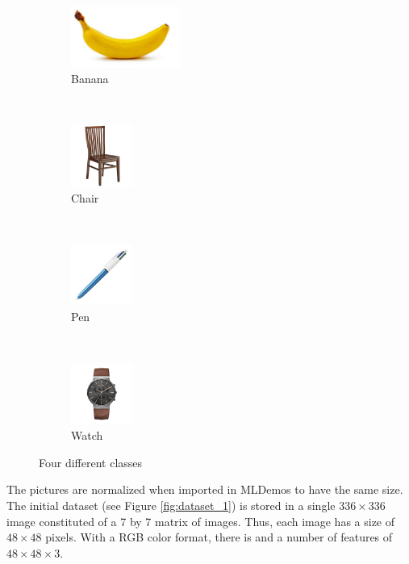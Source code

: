\documentclass[a4paper,10pt]{article}
\begin{document}
\begin{figure}[H]
\centering
    \begin{subfigure}[t]{0.2\textwidth}
        \centering
        \includegraphics[height=2cm]{pictures/banana} 
        \caption{Banana}
        \label{fig:banana}
    \end{subfigure}%
    ~
    \begin{subfigure}[t]{0.2\textwidth}
        \centering
        \includegraphics[height=2cm]{pictures/chair2} 
        \caption{Chair}
        \label{fig:chair}
    \end{subfigure} 
    ~
    \begin{subfigure}[t]{0.2\textwidth}
        \centering
        \includegraphics[height=2cm]{pictures/stylo4} 
        \caption{Pen}
        \label{fig:pen}
    \end{subfigure}
    ~
    \begin{subfigure}[t]{0.2\textwidth}
        \centering
        \includegraphics[height=2cm]{pictures/watch2} 
        \caption{Watch}
        \label{fig:watch}
    \end{subfigure}   
\caption{Four different classes}
\label{fig:class}
\end{figure}


The pictures are normalized when imported in MLDemos to have the same size. The initial dataset (see Figure \ref{fig:dataset_1}) is stored in a single $336 \times 336 $ image constituted of a 7 by 7 matrix of images. Thus, each image has a size of $48 \times 48$ pixels. With a RGB color format, there is and a number of features of $48\times48\times3$.
\end{document}
